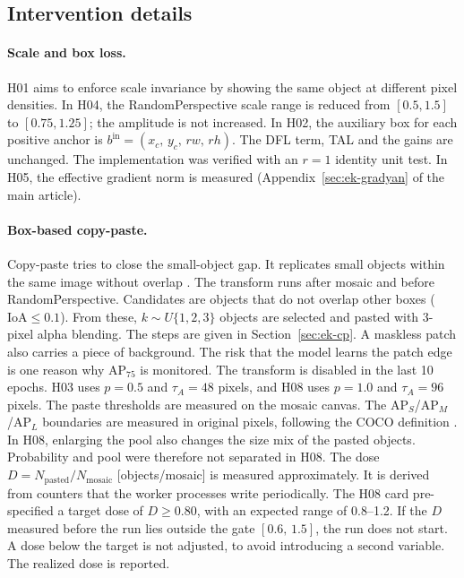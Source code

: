 \subsection{Intervention details}\label{sec:ek-mudahale}
\paragraph{Scale and box loss.}
H01 aims to enforce scale invariance by showing the same object at different pixel densities. In H04, the RandomPerspective scale range is reduced from $[0.5,1.5]$ to $[0.75,1.25]$; the amplitude is not increased. In H02, the auxiliary box for each positive anchor is $b^{\mathrm{in}}=(x_c,\,y_c,\,rw,\,rh)$. The DFL term, TAL and the gains are unchanged. The implementation was verified with an $r=1$ identity unit test. In H05, the effective gradient norm is measured (Appendix~\ref{sec:ek-gradyan} of the main article).

\paragraph{Box-based copy-paste.}
Copy-paste tries to close the small-object gap. It replicates small objects within the same image without overlap \cite{kisantal_2019_smallaug}. The transform runs after mosaic and before RandomPerspective. Candidates are objects that do not overlap other boxes ($\mathrm{IoA}\le0.1$). From these, $k\sim U\{1,2,3\}$ objects are selected and pasted with 3-pixel alpha blending. The steps are given in Section~\ref{sec:ek-cp}. A maskless patch also carries a piece of background. The risk that the model learns the patch edge is one reason why AP$_{75}$ is monitored. The transform is disabled in the last 10 epochs. H03 uses $p=0.5$ and $\tau_A=48$ pixels, and H08 uses $p=1.0$ and $\tau_A=96$ pixels. The paste thresholds are measured on the mosaic canvas. The AP$_S$/AP$_M$/AP$_L$ boundaries are measured in original pixels, following the COCO definition \cite{lin_2014_coco}. In H08, enlarging the pool also changes the size mix of the pasted objects. Probability and pool were therefore not separated in H08. The dose $D=N_{\text{pasted}}/N_{\mathrm{mosaic}}$ [objects/mosaic] is measured approximately. It is derived from counters that the worker processes write periodically. The H08 card pre-specified a target dose of $D\ge0.80$, with an expected range of 0.8--1.2. If the $D$ measured before the run lies outside the gate $[0.6,\,1.5]$, the run does not start. A dose below the target is not adjusted, to avoid introducing a second variable. The realized dose is reported.

